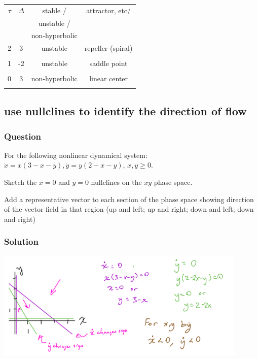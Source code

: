 \documentclass[12pt,letterpaper,noanswers]{exam}
\begin{document}
\begin{tabular}{|c|c|c|c|}
\hline
$\tau$ & $\Delta$ & stable / & attractor, etc/ \\
& & unstable / &  \\
& & non-hyperbolic & \\
\hline
2 & 3 & unstable & repeller (spiral) \\
&  & & \\
\hline
 1    &  -2& unstable & saddle point\\
     & & & \\
     \hline
 0  & 3 & non-hyperbolic & linear center\\
     & & & \\
     \hline
\end{tabular}

\subsection{use nullclines to identify the direction of flow}
\subsubsection{Question}
For the following nonlinear dynamical system: $\dot x = x(3-x-y), \dot y = y(2-x-y)$, $x,y\geq 0$.
\begin{parts}
\item Sketch the $\dot x = 0$ and $\dot y = 0$ nullclines on the $xy$ phase space.
\item Add a representative vector to each section of the phase space showing direction of the vector field in that region (up and left; up and right; down and left; down and right)
\end{parts} 

\subsubsection{Solution}

\includegraphics[width=0.9\textwidth]{img/C10-11nullclines-p1.png}
\end{document}

